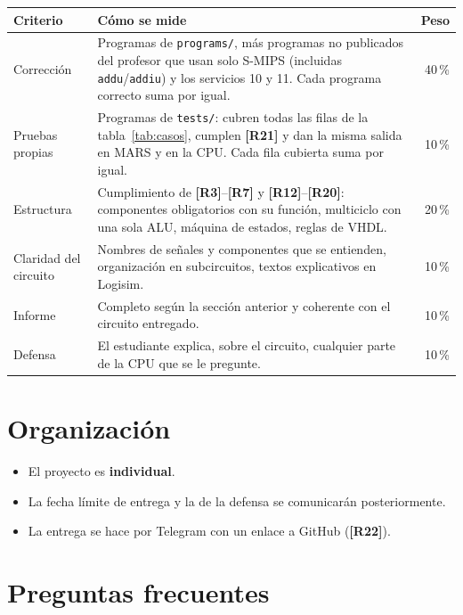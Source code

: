 \documentclass[11pt,a4paper]{article}
\newcommand{\sig}[1]{\texttt{#1}}
\newcommand{\req}[1]{\textbf{[#1]}}
\begin{document}
\begin{center}
\begin{tabularx}{\linewidth}{@{}lXr@{}}
\toprule
Criterio & Cómo se mide & Peso \\
\midrule
Corrección & Programas de \sig{programs/}, más programas no publicados del profesor que usan solo S-MIPS (incluidas \sig{addu}/\sig{addiu}) y los servicios 10 y 11. Cada programa correcto suma por igual. & 40\,\% \\
Pruebas propias & Programas de \sig{tests/}: cubren todas las filas de la tabla~\ref{tab:casos}, cumplen \req{R21} y dan la misma salida en MARS y en la CPU. Cada fila cubierta suma por igual. & 10\,\% \\
Estructura & Cumplimiento de \req{R3}--\req{R7} y \req{R12}--\req{R20}: componentes obligatorios con su función, multiciclo con una sola ALU, máquina de estados, reglas de VHDL. & 20\,\% \\
Claridad del circuito & Nombres de señales y componentes que se entienden, organización en subcircuitos, textos explicativos en Logisim. & 10\,\% \\
Informe & Completo según la sección anterior y coherente con el circuito entregado. & 10\,\% \\
Defensa & El estudiante explica, sobre el circuito, cualquier parte de la CPU que se le pregunte. & 10\,\% \\
\bottomrule
\end{tabularx}
\end{center}

\section{Organización}

\begin{itemize}
\item El proyecto es \textbf{individual}.
\item La fecha límite de entrega y la de la defensa se comunicarán posteriormente.
\item La entrega se hace por Telegram con un enlace a GitHub (\req{R22}).
\end{itemize}

\section{Preguntas frecuentes}
\end{document}

